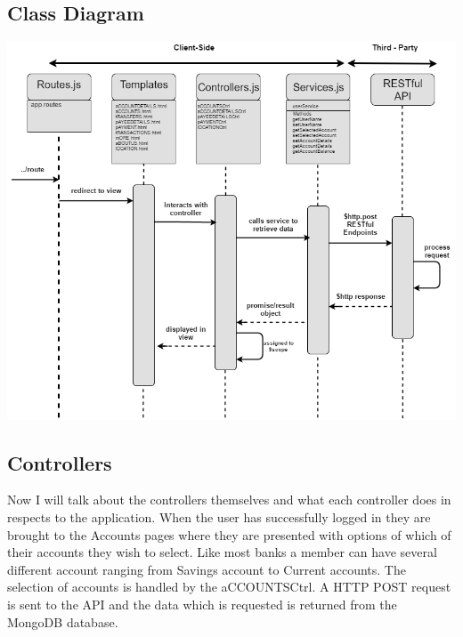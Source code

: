 \subsection{Class Diagram}
\begin{center}
      \includegraphics[scale=0.5]{img/AngularUml.png}
\end{center}

\subsection{Controllers}
Now I will talk about the controllers themselves and what each controller does in respects to the application. When the user has successfully logged in they are brought to the Accounts pages where they are presented with options of which of their accounts they wish to select. Like most banks a member can have several different account ranging from Savings account to Current accounts.  The selection of accounts is handled by the aCCOUNTSCtrl. A HTTP POST request is sent to the API and the data which is requested is returned from the MongoDB database.\paragraph{}

